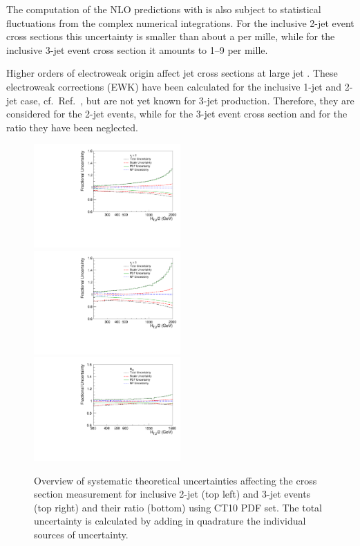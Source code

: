 The computation of the NLO predictions with \NLOJETPP is also subject
to statistical fluctuations from the complex numerical integrations.
For the inclusive 2-jet event cross sections this uncertainty is
smaller than about a per mille, while for the inclusive 3-jet event
cross section it amounts to 1--9 per mille.

Higher orders of electroweak origin affect jet cross sections at large
jet \pt. These electroweak corrections (EWK) have been calculated for
the inclusive 1-jet and 2-jet case, cf.\ Ref.~\cite{Dittmaier:2012kx},
but are not yet known for 3-jet production. Therefore, they are
considered for the 2-jet events, while for the 3-jet event cross
section and for the ratio they have been neglected.

\begin{figure}[!htbp]
\begin{center}
  \includegraphics[width=0.5\textwidth]{Plots_HT_2_150/Theory_Unc_2.pdf}%
  \includegraphics[width=0.5\textwidth]{Plots_HT_2_150/Theory_Unc_3.pdf}\\
  \includegraphics[width=0.5\textwidth]{Plots_HT_2_150/Theory_Unc_Ratio_32.pdf}\\  
  \caption{Overview of systematic theoretical uncertainties affecting the cross section measurement
    for inclusive 2-jet (top left) and 3-jet events (top right) and their ratio \ratio (bottom)
    using CT10 PDF set. The total uncertainty is calculated
    by adding in quadrature the individual sources of uncertainty.}
  \label{fig:theory_unc}
\end{center}
\end{figure}


